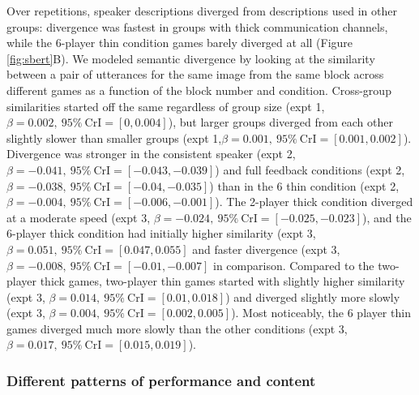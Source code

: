 \documentclass[
  english,
  a4paper,
]{article}
\begin{document}
Over repetitions, speaker descriptions diverged from descriptions used in other groups: divergence was fastest in groups with thick communication channels, while the 6-player thin condition games barely diverged at all (Figure \ref{fig:sbert}B). We modeled semantic divergence by looking at the similarity between a pair of utterances for the same image from the same block across different games as a function of the block number and condition. Cross-group similarities started off the same regardless of group size (expt 1, \(\beta=0.002,\:95\%\:\mathrm{CrI}=[0, 0.004]\)), but larger groups diverged from each other slightly slower than smaller groups (expt 1,\(\beta=0.001,\:95\%\:\mathrm{CrI}=[0.001, 0.002]\)). Divergence was stronger in the consistent speaker (expt 2,\(\beta=-0.041,\:95\%\:\mathrm{CrI}=[-0.043, -0.039]\)) and full feedback conditions (expt 2, \(\beta=-0.038,\:95\%\:\mathrm{CrI}=[-0.04, -0.035]\)) than in the 6 thin condition (expt 2, \(\beta=-0.004,\:95\%\:\mathrm{CrI}=[-0.006, -0.001]\)). The 2-player thick condition diverged at a moderate speed (expt 3, \(\beta=-0.024,\:95\%\:\mathrm{CrI}=[-0.025, -0.023]\)), and the 6-player thick condition had initially higher similarity (expt 3, \(\beta=0.051,\:95\%\:\mathrm{CrI}=[0.047, 0.055]\) and faster divergence (expt 3, \(\beta=-0.008,\:95\%\:\mathrm{CrI}=[-0.01, -0.007]\) in comparison. Compared to the two-player thick games, two-player thin games started with slightly higher similarity (expt 3, \(\beta=0.014,\:95\%\:\mathrm{CrI}=[0.01, 0.018]\)) and diverged slightly more slowly (expt 3, \(\beta=0.004,\:95\%\:\mathrm{CrI}=[0.002, 0.005]\)). Most noticeably, the 6 player thin games diverged much more slowly than the other conditions (expt 3, \(\beta=0.017,\:95\%\:\mathrm{CrI}=[0.015, 0.019]\)).

\hypertarget{different-patterns-of-performance-and-content}{%
\subsubsection{Different patterns of performance and content}\label{different-patterns-of-performance-and-content}}
\end{document}
